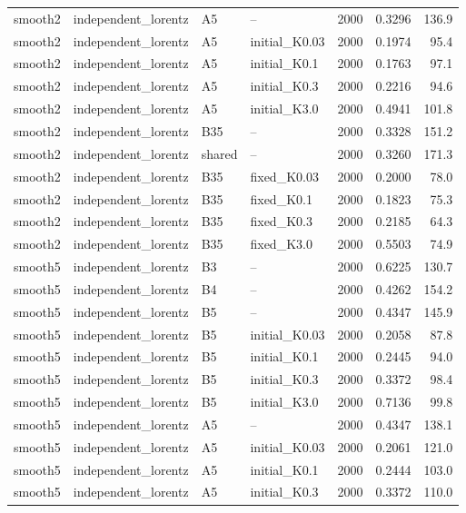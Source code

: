 \begin{longtable}{llllrrr}
smooth2 & independent\_lorentz & A5 & -- & 2000 & 0.3296 & 136.9 \\
smooth2 & independent\_lorentz & A5 & initial\_K0.03 & 2000 & 0.1974 & 95.4 \\
smooth2 & independent\_lorentz & A5 & initial\_K0.1 & 2000 & 0.1763 & 97.1 \\
smooth2 & independent\_lorentz & A5 & initial\_K0.3 & 2000 & 0.2216 & 94.6 \\
smooth2 & independent\_lorentz & A5 & initial\_K3.0 & 2000 & 0.4941 & 101.8 \\
smooth2 & independent\_lorentz & B35 & -- & 2000 & 0.3328 & 151.2 \\
smooth2 & independent\_lorentz & shared & -- & 2000 & 0.3260 & 171.3 \\
smooth2 & independent\_lorentz & B35 & fixed\_K0.03 & 2000 & 0.2000 & 78.0 \\
smooth2 & independent\_lorentz & B35 & fixed\_K0.1 & 2000 & 0.1823 & 75.3 \\
smooth2 & independent\_lorentz & B35 & fixed\_K0.3 & 2000 & 0.2185 & 64.3 \\
smooth2 & independent\_lorentz & B35 & fixed\_K3.0 & 2000 & 0.5503 & 74.9 \\
smooth5 & independent\_lorentz & B3 & -- & 2000 & 0.6225 & 130.7 \\
smooth5 & independent\_lorentz & B4 & -- & 2000 & 0.4262 & 154.2 \\
\rowcolor{oursbg}
smooth5 & independent\_lorentz & B5 & -- & 2000 & 0.4347 & 145.9 \\
\rowcolor{oursbg}
smooth5 & independent\_lorentz & B5 & initial\_K0.03 & 2000 & 0.2058 & 87.8 \\
\rowcolor{oursbg}
smooth5 & independent\_lorentz & B5 & initial\_K0.1 & 2000 & 0.2445 & 94.0 \\
\rowcolor{oursbg}
smooth5 & independent\_lorentz & B5 & initial\_K0.3 & 2000 & 0.3372 & 98.4 \\
\rowcolor{oursbg}
smooth5 & independent\_lorentz & B5 & initial\_K3.0 & 2000 & 0.7136 & 99.8 \\
smooth5 & independent\_lorentz & A5 & -- & 2000 & 0.4347 & 138.1 \\
smooth5 & independent\_lorentz & A5 & initial\_K0.03 & 2000 & 0.2061 & 121.0 \\
smooth5 & independent\_lorentz & A5 & initial\_K0.1 & 2000 & 0.2444 & 103.0 \\
smooth5 & independent\_lorentz & A5 & initial\_K0.3 & 2000 & 0.3372 & 110.0 \\

\end{longtable}
